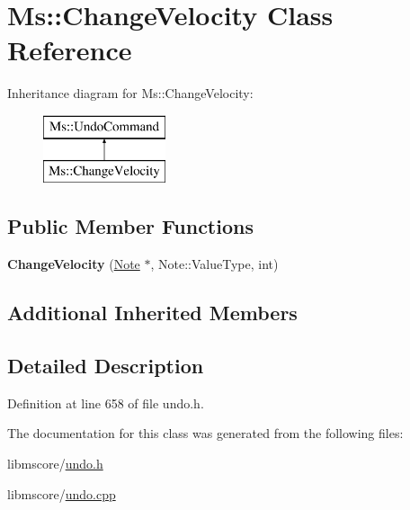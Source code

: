 \hypertarget{class_ms_1_1_change_velocity}{}\section{Ms\+:\+:Change\+Velocity Class Reference}
\label{class_ms_1_1_change_velocity}
Inheritance diagram for Ms\+:\+:Change\+Velocity\+:\begin{figure}[H]
\begin{center}
\leavevmode
\includegraphics[height=2.000000cm]{class_ms_1_1_change_velocity}
\end{center}
\end{figure}
\subsection*{Public Member Functions}
\begin{DoxyCompactItemize}
\item 
\mbox{\label{class_ms_1_1_change_velocity_aae06b595011ea91cf27a6207f889f010}} 
{\bfseries Change\+Velocity} (\hyperlink{class_ms_1_1_note}{Note} $\ast$, Note\+::\+Value\+Type, int)
\end{DoxyCompactItemize}
\subsection*{Additional Inherited Members}


\subsection{Detailed Description}


Definition at line 658 of file undo.\+h.



The documentation for this class was generated from the following files\+:\begin{DoxyCompactItemize}
\item 
libmscore/\hyperlink{undo_8h}{undo.\+h}\item 
libmscore/\hyperlink{undo_8cpp}{undo.\+cpp}\end{DoxyCompactItemize}
